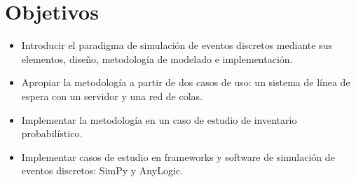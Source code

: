 \documentclass[11pt,a4paper]{article}
\begin{document}
\section{Objetivos}
\begin{itemize}
 \item Introducir el paradigma de simulación de eventos discretos mediante sus elementos,
 diseño, metodología de modelado e implementación.
 \item Apropiar la metodología a partir de dos casos de uso: un sistema de línea de
 espera con un servidor y una red de colas.
 \item Implementar la metodología en un caso de estudio de inventario probabilístico.
 \item Implementar casos de estudio en frameworks y software de simulación de eventos
 discretos: SimPy y AnyLogic.
\end{itemize}
\end{document}
